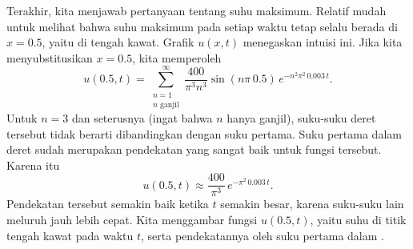 \begin{example}
\begin{myfig}
\capstart
{}
\caption{Grafik suhu $u(x,t)$ pada kawat di posisi $x$
pada waktu $t$ untuk $0 \leq t \leq 100$.  Perhatikan syarat samping
$u(0,t)=u(1,t)=0$ dan bagaimana fungsi eksponensial membuat suhu meluruh
seiring waktu.\label{heat:wireexfig}}
\end{myfig}

Terakhir, kita menjawab pertanyaan tentang suhu maksimum.  Relatif
mudah untuk melihat
bahwa suhu maksimum pada setiap waktu tetap selalu berada di $x=0.5$, yaitu
di tengah kawat.  Grafik $u(x,t)$ menegaskan intuisi ini.
Jika kita menyubstitusikan $x=0.5$, kita memperoleh
\begin{equation*}
u(0.5,t) = 
\sum_{\substack{n=1 \\ n \text{ ganjil}}}^\infty
\frac{400}{\pi^3 n^3}
\sin (n \pi\, 0.5 )
\, e^{-n^2 \pi^2 \, 0.003 \, t} .
\end{equation*}
Untuk $n=3$ dan seterusnya (ingat bahwa $n$ hanya ganjil), suku-suku
deret tersebut
tidak berarti dibandingkan dengan suku pertama.
Suku pertama dalam deret sudah merupakan pendekatan yang sangat baik
untuk fungsi tersebut.  
Karena itu 
\begin{equation*}
u(0.5,t) \approx
\frac{400}{\pi^3}
\, e^{-\pi^2 \, 0.003 \, t} .
\end{equation*}
Pendekatan tersebut semakin baik ketika $t$ semakin besar,
karena suku-suku lain
meluruh jauh lebih cepat.
Kita menggambar fungsi $u(0.5,t)$, yaitu suhu di titik tengah kawat
pada waktu $t$, serta pendekatannya oleh suku pertama
dalam .

\begin{myfig}
\capstart
{}
\caption{Suhu di titik tengah kawat (kurva bawah),
dan pendekatan suhu ini dengan hanya menggunakan suku pertama dalam
deret (kurva atas).\label{heat:wireexmaxfig}}
\end{myfig}


\end{example}
